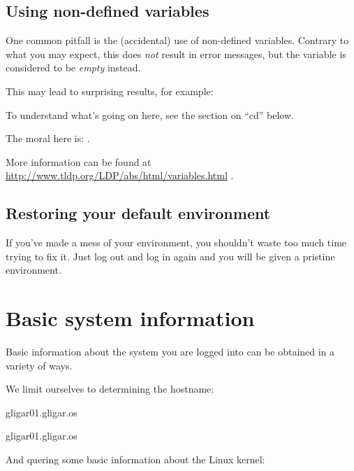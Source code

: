 \begin{prompt}
\end{prompt}

\subsection{Using non-defined variables}

One common pitfall is the (accidental) use of non-defined variables.  Contrary
to what you may expect, this does \emph{not} result in error messages, but the
variable is considered to be \emph{empty} instead.

This may lead to surprising results, for example:

\begin{prompt}
\end{prompt}

To understand what's going on here, see the section on ``cd'' below.

The moral here is: .

More information can be found at \url{http://www.tldp.org/LDP/abs/html/variables.html} .

\subsection{Restoring your default environment}

If you've made a mess of your environment, you shouldn't waste too much time
trying to fix it. Just log out and log in again and you will be given a
pristine environment.

\section{Basic system information}

Basic information about the system you are logged into can be obtained in a variety of ways.

We limit ourselves to determining the hostname:

\begin{prompt}
  gligar01.gligar.os

  gligar01.gligar.os
\end{prompt}

And quering some basic information about the Linux kernel:


